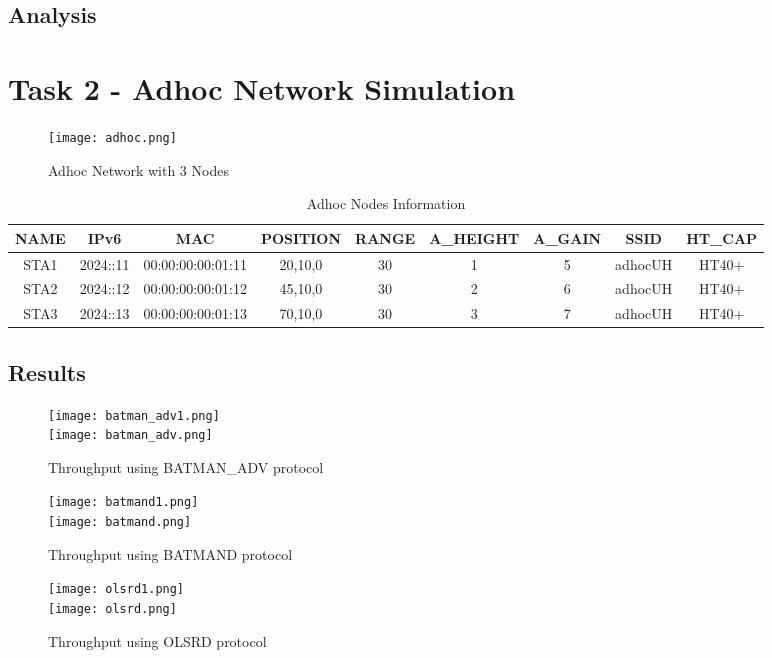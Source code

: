 \documentclass{article}
\begin{document}
\subsection{Analysis}

\newpage
\section{Task 2 - Adhoc Network Simulation}
    \begin{figure}[h]
        \centering
        \texttt{[image: adhoc.png]}
        \caption{Adhoc Network with 3 Nodes}
        \label{fig:adhocNetwork}
    \end{figure}
    \begin{table}[h]
        \begin{tabular}{|c|c|c|c|c|c|c|c|c|}
        \hline
        NAME & IPv6 & MAC & POSITION & RANGE & A\_HEIGHT & A\_GAIN & SSID & HT\_CAP\\
        \hline
        STA1 & 2024::11 & 00:00:00:00:01:11 & 20,10,0 & 30 & 1 & 5 & adhocUH & HT40+ \\
        STA2 & 2024::12 & 00:00:00:00:01:12 & 45,10,0 & 30 & 2 & 6 & adhocUH & HT40+ \\
        STA3 & 2024::13 & 00:00:00:00:01:13 & 70,10,0 & 30 & 3 & 7 & adhocUH & HT40+ \\
        \hline
        \end{tabular}
        \caption{Adhoc Nodes Information}
        \label{tab:3}
    \end{table}
\newpage
\subsection{Results}
    \begin{figure}[h]
        \centering
        \texttt{[image: batman\_adv1.png]} \\
        \texttt{[image: batman\_adv.png]}
        \caption{Throughput using BATMAN\_ADV protocol}
        \label{fig:adhocProto}
    \end{figure}
    \begin{figure}[h]
        \centering
        \texttt{[image: batmand1.png]} \\
        \texttt{[image: batmand.png]}
        \caption{Throughput using BATMAND protocol}
        \label{fig:adhocProto}
    \end{figure}
    \begin{figure}[h]
        \centering
        \texttt{[image: olsrd1.png]} \\
        \texttt{[image: olsrd.png]}
        \caption{Throughput using OLSRD protocol}
        \label{fig:adhocProto}
    \end{figure}
\end{document}
